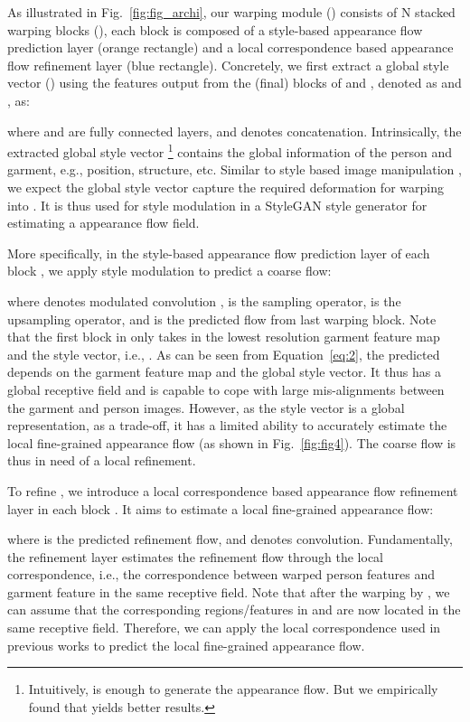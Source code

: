 \documentclass[10pt,twocolumn,letterpaper]{article}
\begin{document}
As illustrated in Fig.~\ref{fig:fig_archi}, our warping module () consists of N stacked warping blocks (), each block is composed of a style-based appearance flow prediction layer (orange rectangle) and a local correspondence based appearance flow refinement layer (blue rectangle). Concretely, we first extract a global style vector () using the features output from the   (final) blocks of  and , denoted as  and , as:

where  and  are  fully connected layers, and  denotes concatenation. Intrinsically, the extracted global style vector \footnote{Intuitively,  is enough to generate the appearance flow. But we empirically found that  yields better results.} contains the global information of the person and garment, e.g., position, structure, etc. Similar to style based image manipulation \cite{shen2020interfacegan,shen2021closed, or2020lifespan,he2021disentangled}, we expect the global style vector  capture the required deformation for warping  into . It is thus used for  style modulation in a StyleGAN style generator for estimating a appearance flow field.  

More specifically, in the style-based appearance flow prediction layer of each block , we apply style modulation to predict a coarse flow:

where  denotes modulated convolution \cite{karras2019style},  is the sampling operator,  is the upsampling operator, and  is the predicted flow from last warping block. Note that the first block  in  only takes in the lowest resolution garment feature map and the style vector, i.e., . As can be seen from Equation~\ref{eq:2}, the predicted  depends on the garment feature map and the global style vector. It thus has a global receptive field and is capable to cope with large mis-alignments between the garment and  person images. However, as the style vector  is a global representation, as a trade-off, it has a limited ability to accurately estimate the local fine-grained appearance flow (as shown in Fig.~\ref{fig:fig4}). The coarse flow is thus in need of a local refinement.

To refine , we introduce a local correspondence based appearance flow refinement layer in  each block . It aims to estimate a local fine-grained appearance flow: 

where  is the predicted refinement flow, and  denotes convolution. Fundamentally, the refinement layer estimates the refinement flow through the local correspondence, i.e., the correspondence between warped person features and garment feature in the same receptive field. Note that after the warping by , we can assume that the corresponding regions/features in  and  are now located in the same receptive field. Therefore, we can apply the local correspondence used in previous works \cite{han2019clothflow,ge2021parser} to predict the local fine-grained appearance flow.
\end{document}
